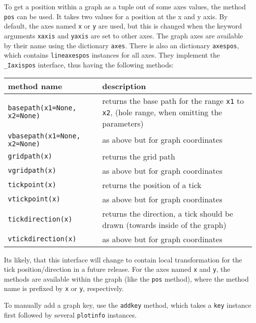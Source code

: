 To get a position within a graph as a tuple out of some axes values,
the method \verb|pos| can be used. It takes two values for a position
at the x and y axis. By default, the axes named \verb|x| or \verb|y|
are used, but this is changed when the keyword arguments \verb|xaxis|
and \verb|yaxis| are set to other axes. The graph axes are available
by their name using the dictionary \verb|axes|. There is also an
dictionary \verb|axespos|, which contains \verb|lineaxespos| instances
for all axes. They implement the \verb|_Iaxispos| interface, thus
having the following methods:

\medskip
\begin{tabularx}{\linewidth}{l>{\raggedright\arraybackslash}X}
method name&description\\
\hline
\texttt{basepath(x1=None, x2=None)}&returns the base path for the range \texttt{x1} to \texttt{x2}, (hole range, when omitting the parameters)\\
\texttt{vbasepath(x1=None, x2=None)}&as above but for graph coordinates\\
\texttt{gridpath(x)}&returns the grid path\\
\texttt{vgridpath(x)}&as above but for graph coordinates\\
\texttt{tickpoint(x)}&returns the position of a tick\\
\texttt{vtickpoint(x)}&as above but for graph coordinates\\
\texttt{tickdirection(x)}&returns the direction, a tick should be drawn (towards inside of the graph)\\
\texttt{vtickdirection(x)}&as above but for graph coordinates\\
\end{tabularx}
\medskip

Its likely, that this interface will change to contain local
transformation for the tick position/direction in a future release.
For the axes named \verb|x| and \verb|y|, the methods are available
within the graph (like the \verb|pos| method), where the method name
is prefixed by \verb|x| or \verb|y|, respectively.

To manually add a graph key, use the \verb|addkey| method, which takes
a \verb|key| instance first followed by several \verb|plotinfo|
instances.

